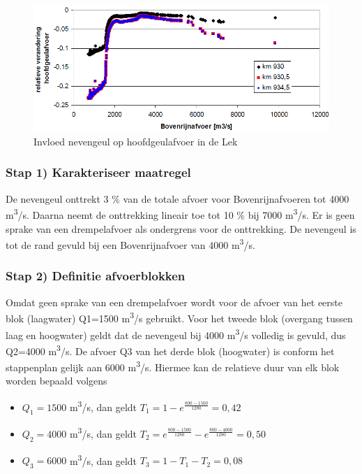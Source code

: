 \begin{figure}
\includegraphics[width=\columnwidth]{figures/Fig10.png}
\caption{Invloed nevengeul op hoofdgeulafvoer in de Lek}
\label{Fig10}
\end{figure}

\subsubsection*{Stap 1) Karakteriseer maatregel}

De nevengeul onttrekt 3 \% van de totale afvoer voor Bovenrijnafvoeren tot 4000 m\textsuperscript{3}/s.
Daarna neemt de onttrekking lineair toe tot 10 \% bij 7000 m\textsuperscript{3}/s.
Er is geen sprake van een drempelafvoer als ondergrens voor de onttrekking.
De nevengeul is tot de rand gevuld bij een Bovenrijnafvoer van 4000 m\textsuperscript{3}/s.

\subsubsection*{Stap 2) Definitie afvoerblokken}

Omdat geen sprake van een drempelafvoer wordt voor de afvoer van het eerste blok (laagwater) Q1=1500 m\textsuperscript{3}/s gebruikt.
Voor het tweede blok (overgang tussen laag en hoogwater) geldt dat de nevengeul bij 4000 m\textsuperscript{3}/s volledig is gevuld, dus Q2=4000 m\textsuperscript{3}/s.
De afvoer Q3 van het derde blok (hoogwater) is conform het stappenplan gelijk aan 6000 m\textsuperscript{3}/s.
Hiermee kan de relatieve duur van elk blok worden bepaald volgens

\begin{itemize}
\item $Q_1=1500$ m\textsuperscript{3}/s, dan geldt $T_1 = 1-e^{\frac{800-1500}{1280}} = 0,42$
\item $Q_2=4000$ m\textsuperscript{3}/s, dan geldt $T_2 = e^{\frac{800-1500}{1280}} - e^{\frac{800-4000}{1280}} = 0,50$
\item $Q_3=6000$ m\textsuperscript{3}/s, dan geldt $T_3 = 1-T_1-T_2 = 0,08$
\end{itemize}

